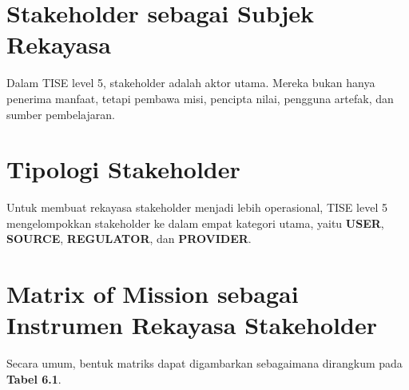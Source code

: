 \documentclass[
  letterpaper,
  DIV=11,
  numbers=noendperiod]{scrreprt}
\begin{document}

\section*{Stakeholder sebagai Subjek
Rekayasa}\label{stakeholder-sebagai-subjek-rekayasa}


Dalam TISE level 5, stakeholder adalah aktor utama. Mereka bukan hanya
penerima manfaat, tetapi pembawa misi, pencipta nilai, pengguna artefak,
dan sumber pembelajaran.

\section*{Tipologi Stakeholder}\label{tipologi-stakeholder}


Untuk membuat rekayasa stakeholder menjadi lebih operasional, TISE level
5 mengelompokkan stakeholder ke dalam empat kategori utama, yaitu
\textbf{USER}, \textbf{SOURCE}, \textbf{REGULATOR}, dan
\textbf{PROVIDER}.

\section*{Matrix of Mission sebagai Instrumen Rekayasa
Stakeholder}\label{matrix-of-mission-sebagai-instrumen-rekayasa-stakeholder}


Secara umum, bentuk matriks dapat digambarkan sebagaimana dirangkum pada
\textbf{Tabel 6.1}.
\end{document}

